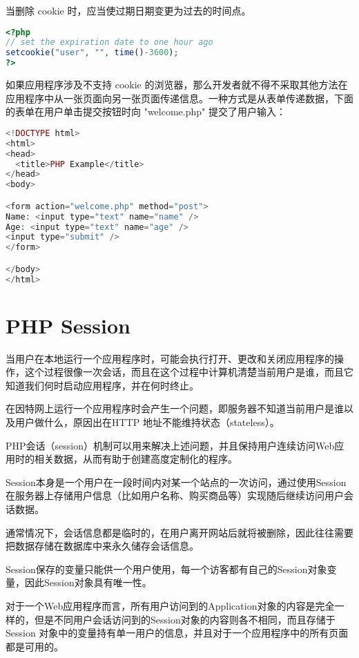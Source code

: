 当删除 cookie 时，应当使过期日期变更为过去的时间点。


\begin{lstlisting}[language=PHP]
<?php 
// set the expiration date to one hour ago
setcookie("user", "", time()-3600);
?>
\end{lstlisting}

如果应用程序涉及不支持 cookie 的浏览器，那么开发者就不得不采取其他方法在应用程序中从一张页面向另一张页面传递信息。一种方式是从表单传递数据，下面的表单在用户单击提交按钮时向 "welcome.php" 提交了用户输入：


\begin{lstlisting}[language=PHP]
<!DOCTYPE html>
<html>
<head>
  <title>PHP Example</title>
</head>
<body>

<form action="welcome.php" method="post">
Name: <input type="text" name="name" />
Age: <input type="text" name="age" />
<input type="submit" />
</form>

</body>
</html>
\end{lstlisting}





\chapter{PHP Session}

当用户在本地运行一个应用程序时，可能会执行打开、更改和关闭应用程序的操作，这个过程很像一次会话，而且在这个过程中计算机清楚当前用户是谁，而且它知道我们何时启动应用程序，并在何时终止。

在因特网上运行一个应用程序时会产生一个问题，即服务器不知道当前用户是谁以及用户做什么，原因出在HTTP 地址不能维持状态（stateless）。

PHP会话（session）机制可以用来解决上述问题，并且保持用户连续访问Web应用时的相关数据，从而有助于创建高度定制化的程序。

Session本身是一个用户在一段时间内对某一个站点的一次访问，通过使用Session在服务器上存储用户信息（比如用户名称、购买商品等）实现随后继续访问用户会话数据。

通常情况下，会话信息都是临时的，在用户离开网站后就将被删除，因此往往需要把数据存储在数据库中来永久储存会话信息。

Session保存的变量只能供一个用户使用，每一个访客都有自己的Session对象变量，因此Session对象具有唯一性。


对于一个Web应用程序而言，所有用户访问到的Application对象的内容是完全一样的，但是不同用户会话访问到的Session对象的内容则各不相同，而且存储于Session 对象中的变量持有单一用户的信息，并且对于一个应用程序中的所有页面都是可用的。




